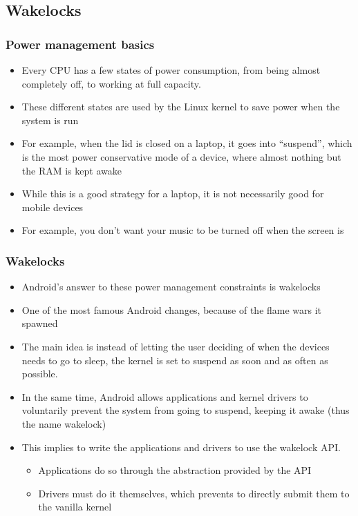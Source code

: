 \subsection{Wakelocks}
\begin{frame}
  \frametitle{Power management basics}
  \begin{itemize}
  \item Every CPU has a few states of power consumption, from being
    almost completely off, to working at full capacity.
  \item These different states are used by the Linux kernel to save
    power when the system is run
  \item For example, when the lid is closed on a laptop, it goes into
    ``suspend'', which is the most power conservative mode of a
    device, where almost nothing but the RAM is kept awake
  \item While this is a good strategy for a laptop, it is not
    necessarily good for mobile devices
  \item For example, you don't want your music to be turned off when
    the screen is
  \end{itemize}
\end{frame}

\begin{frame}
  \frametitle{Wakelocks}
  \begin{itemize}
  \item Android's answer to these power management constraints is wakelocks
  \item One of the most famous Android changes, because of the
    flame wars it spawned
  \item The main idea is instead of letting the user deciding of when
    the devices needs to go to sleep, the kernel is set to suspend as
    soon and as often as possible. 
  \item In the same time, Android allows applications and kernel
    drivers to voluntarily prevent the system from going to suspend,
    keeping it awake (thus the name wakelock)
  \item This implies to write the applications and drivers to use the
    wakelock API.
    \begin{itemize}
    \item Applications do so through the abstraction provided by the
      API
    \item Drivers must do it themselves, which prevents to directly
      submit them to the vanilla kernel
    \end{itemize}
  \end{itemize}
\end{frame}

